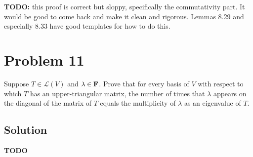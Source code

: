 \documentclass{article}
\begin{document}
\vs

\textbf{TODO:} this proof is correct but sloppy, specifically the commutativity part. It would be good to come back and make it clean and rigorous. Lemmas 8.29 and especially 8.33 have good templates for how to do this.

\section*{Problem 11}
Suppose $T\in\mathcal{L}(V)$ and $\lambda\in\mathbf{F}$. Prove that for every basis of $V$ with respect to which $T$ has an upper-triangular matrix, the number of times that $\lambda$ appears on the diagonal of the matrix of $T$ equals the multiplicity of $\lambda$ as an eigenvalue of $T$.

\subsection*{Solution}
\textbf{TODO}
\end{document}
